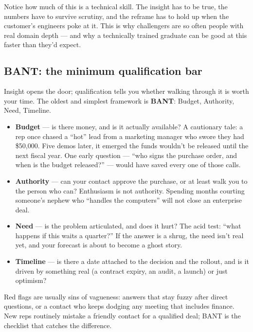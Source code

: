 Notice how much of this is a technical skill. The insight has to be true, the numbers have to survive scrutiny, and the reframe has to hold up when the customer's engineers poke at it. This is why challengers are so often people with real domain depth — and why a technically trained graduate can be good at this faster than they'd expect.



\subsection{BANT: the minimum qualification bar}


Insight opens the door; qualification tells you whether walking through it is worth your time. The oldest and simplest framework is \textbf{BANT}: Budget, Authority, Need, Timeline.


\begin{itemize}[leftmargin=*]
\item \textbf{Budget} — is there money, and is it actually available? A cautionary tale: a rep once chased a ``hot'' lead from a marketing manager who swore they had \$50,000. Five demos later, it emerged the funds wouldn't be released until the next fiscal year. One early question — ``who signs the purchase order, and when is the budget released?'' — would have saved every one of those calls.
\item \textbf{Authority} — can your contact approve the purchase, or at least walk you to the person who can? Enthusiasm is not authority. Spending months courting someone's nephew who ``handles the computers'' will not close an enterprise deal.
\item \textbf{Need} — is the problem articulated, and does it hurt? The acid test: ``what happens if this waits a quarter?'' If the answer is a shrug, the need isn't real yet, and your forecast is about to become a ghost story.
\item \textbf{Timeline} — is there a date attached to the decision and the rollout, and is it driven by something real (a contract expiry, an audit, a launch) or just optimism?
\end{itemize}

Red flags are usually sins of vagueness: answers that stay fuzzy after direct questions, or a contact who keeps dodging any meeting that includes finance. New reps routinely mistake a friendly contact for a qualified deal; BANT is the checklist that catches the difference.



